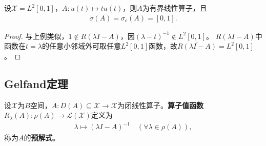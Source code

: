 \documentclass[../../main.tex]{subfiles}%
\begin{document}
\begin{example}
设$\mathscr{X}=L^2[0,1]$，$A:u(t)\mapsto tu(t)$，则$A$为有界线性算子，且
\begin{align*}
\sigma(A)=\sigma_c(A)=[0,1].
\end{align*}
\begin{proof}
与上例类似，$1\notin R(\lambda I-A)$，因$(\lambda-t)^{-1}\notin L^2[0,1]$。
$R(\lambda I-A)$中函数在$t=\lambda$的任意小邻域外可取任意$L^2[0,1]$函数，故$\overline{R(\lambda I-A)}=L^2[0,1]$。
\end{proof}
\end{example}


\subsection{Gelfand定理}

\begin{definition}
设$\mathscr{X}$为$B$空间，$A:D(A)\subseteq\mathscr{X}\to\mathscr{X}$为闭线性算子。\textbf{算子值函数}$R_{\lambda}(A):\rho(A)\to\mathscr{L}(\mathscr{X})$定义为
\begin{align*}
\lambda\mapsto(\lambda I-A)^{-1}\quad(\forall\lambda\in\rho(A)),
\end{align*}
称为$A$的\textbf{预解式}。
\end{definition}
\end{document}
